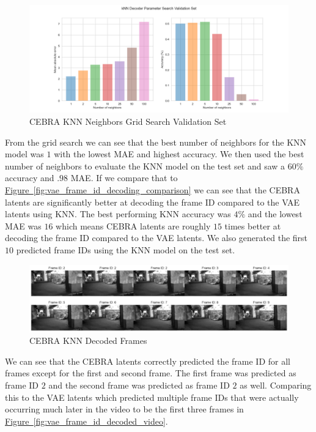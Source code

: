 \documentclass[12pt, letterpaper]{article}
\begin{document}
\begin{figure}[H]
    \centering
    \includegraphics[width=1.0\textwidth]{cebra_latents_knn_decoder_grid_search.png}
    \caption{CEBRA KNN Neighbors Grid Search Validation Set}
    \label{fig:cebra_knn_frame_id_accuracy_mae}
\end{figure}

From the grid search we can see that the best number of neighbors for the KNN model was $1$ with the lowest MAE and highest accuracy. We then used the best number of neighbors to evaluate the KNN model on the test set and saw a $60\%$ accuracy and $.98$ MAE. If we compare that to \hyperref[fig:vae_frame_id_decoding_comparison]{Figure~\ref{fig:vae_frame_id_decoding_comparison}} we can see that the CEBRA latents are significantly better at decoding the frame ID compared to the VAE latents using KNN. The best performing KNN accuracy was $4\%$ and the lowest MAE was $16$ which means CEBRA latents are roughly $15$ times better at decoding the frame ID compared to the VAE latents. We also generated the first $10$ predicted frame IDs using the KNN model on the test set.

\begin{figure}[H]
    \centering
    \includegraphics[width=1.0\textwidth]{cebra_knn_video.png}
    \caption{CEBRA KNN Decoded Frames}
    \label{fig:cebra_knn_frame_id_decoded_video}
\end{figure}

We can see that the CEBRA latents correctly predicted the frame ID for all frames except for the first and second frame. The first frame was predicted as frame ID $2$ and the second frame was predicted as frame ID $2$ as well. Comparing this to the VAE latents which predicted multiple frame IDs that were actually occurring much later in the video to be the first three frames in \hyperref[fig:vae_frame_id_decoded_video]{Figure~\ref{fig:vae_frame_id_decoded_video}}. 
\end{document}
